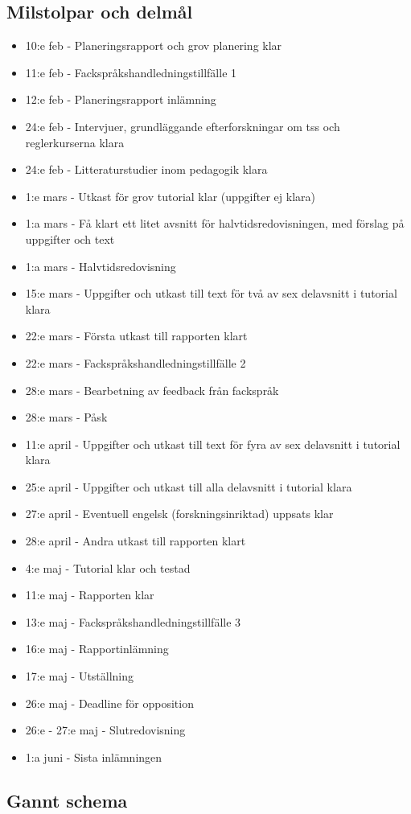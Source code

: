\documentclass{article}
\begin{document}
\subsection{Milstolpar och delmål}
\begin{itemize}
\item 10:e feb - Planeringsrapport och grov planering klar
\item 11:e feb - Fackspråkshandledningstillfälle 1
\item 12:e feb - Planeringsrapport inlämning
\item 24:e feb - Intervjuer, grundläggande efterforskningar om tss och reglerkurserna klara
\item 24:e feb - Litteraturstudier inom pedagogik klara
\item 1:e mars - Utkast för grov tutorial klar (uppgifter ej klara)
\item 1:a mars - Få klart ett litet avsnitt för halvtidsredovisningen, med förslag på uppgifter och text
\item 1:a mars - Halvtidsredovisning
\item 15:e mars - Uppgifter och utkast till text för två av sex delavsnitt i tutorial klara
\item 22:e mars - Första utkast till rapporten klart
\item 22:e mars - Fackspråkshandledningstillfälle 2
\item 28:e mars - Bearbetning av feedback från fackspråk
\item 28:e mars - Påsk
\item 11:e april - Uppgifter och utkast till text för fyra av sex delavsnitt i tutorial klara
\item 25:e april - Uppgifter och utkast till alla delavsnitt i tutorial klara
\item 27:e april - Eventuell engelsk (forskningsinriktad) uppsats klar
\item 28:e april - Andra utkast till rapporten klart
\item 4:e maj - Tutorial klar och testad
\item 11:e maj - Rapporten klar
\item 13:e maj - Fackspråkshandledningstillfälle 3
\item 16:e maj - Rapportinlämning
\item 17:e maj - Utställning
\item 26:e maj - Deadline för opposition
\item 26:e - 27:e maj - Slutredovisning
\item 1:a juni - Sista inlämningen
\end{itemize}

\newpage
\subsection{Gannt schema}
\begin{figure}
    \centering
    
\end{figure}
\end{document}

